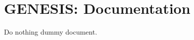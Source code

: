 \documentclass[12pt]{article}
\begin{document}
\section*{GENESIS: Documentation}

Do nothing dummy document.
\end{document}
